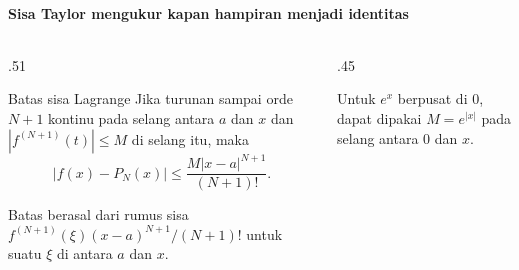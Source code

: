 \documentclass{../../kalkulus-ppt}
\begin{document}
\begin{frame}{\insertsection}
    \framesubtitle{Sisa Taylor mengukur kapan hampiran menjadi identitas}
    \begin{columns}[c,onlytextwidth]
        \begin{column}{.51\textwidth}
            \begin{block}{Batas sisa Lagrange}
                Jika turunan sampai orde $N+1$ kontinu pada
                selang antara $a$ dan $x$ dan
                $|f^{(N+1)}(t)|\le M$ di selang itu, maka
                \[
                    |f(x)-P_N(x)|
                    \le \frac{M|x-a|^{N+1}}{(N+1)!}.
                \]
            \end{block}
            Batas berasal dari rumus sisa
            $f^{(N+1)}(\xi)(x-a)^{N+1}/(N+1)!$
            untuk suatu $\xi$ di antara $a$ dan $x$.
        \end{column}
        \begin{column}{.45\textwidth}
            \begin{contoh}
                Untuk $e^x$ berpusat di $0$, dapat dipakai
                $M=e^{|x|}$ pada selang antara $0$ dan $x$.
            \end{contoh}
        \end{column}
    \end{columns}
\end{frame}
\end{document}

